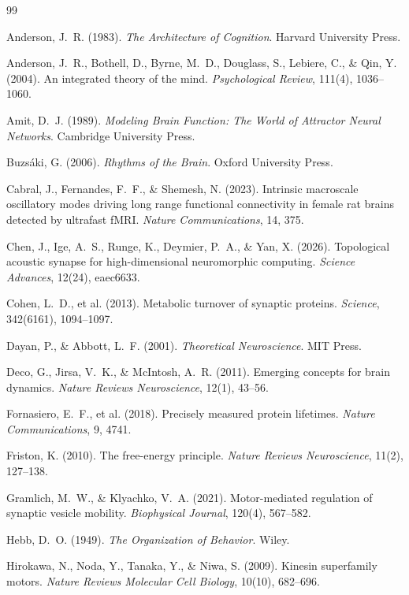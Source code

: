 \documentclass[12pt, oneside]{book}
\theoremstyle{plain}
\theoremstyle{definition}
\theoremstyle{remark}
\begin{document}
\begin{thebibliography}{99}

Anderson, J.~R. (1983).
\textit{The Architecture of Cognition}.
Harvard University Press.

Anderson, J.~R., Bothell, D., Byrne, M.~D., Douglass, S.,
Lebiere, C., \& Qin, Y. (2004).
An integrated theory of the mind.
\textit{Psychological Review}, 111(4), 1036--1060.

Amit, D.~J. (1989).
\textit{Modeling Brain Function: The World of Attractor Neural Networks}.
Cambridge University Press.

Buzsáki, G. (2006).
\textit{Rhythms of the Brain}.
Oxford University Press.

Cabral, J., Fernandes, F.~F., \& Shemesh, N. (2023).
Intrinsic macroscale oscillatory modes driving long range
functional connectivity in female rat brains detected by ultrafast fMRI.
\textit{Nature Communications}, 14, 375.

Chen, J., Ige, A.~S., Runge, K., Deymier, P.~A., \& Yan, X. (2026).
Topological acoustic synapse for high-dimensional neuromorphic computing.
\textit{Science Advances}, 12(24), eaec6633.

Cohen, L.~D., et al. (2013).
Metabolic turnover of synaptic proteins.
\textit{Science}, 342(6161), 1094--1097.

Dayan, P., \& Abbott, L.~F. (2001).
\textit{Theoretical Neuroscience}.
MIT Press.

Deco, G., Jirsa, V.~K., \& McIntosh, A.~R. (2011).
Emerging concepts for brain dynamics.
\textit{Nature Reviews Neuroscience}, 12(1), 43--56.

Fornasiero, E.~F., et al. (2018).
Precisely measured protein lifetimes.
\textit{Nature Communications}, 9, 4741.

Friston, K. (2010).
The free-energy principle.
\textit{Nature Reviews Neuroscience}, 11(2), 127--138.

Gramlich, M.~W., \& Klyachko, V.~A. (2021).
Motor-mediated regulation of synaptic vesicle mobility.
\textit{Biophysical Journal}, 120(4), 567--582.

Hebb, D.~O. (1949).
\textit{The Organization of Behavior}.
Wiley.

Hirokawa, N., Noda, Y., Tanaka, Y., \& Niwa, S. (2009).
Kinesin superfamily motors.
\textit{Nature Reviews Molecular Cell Biology}, 10(10), 682--696.


\end{thebibliography}
\end{document}
